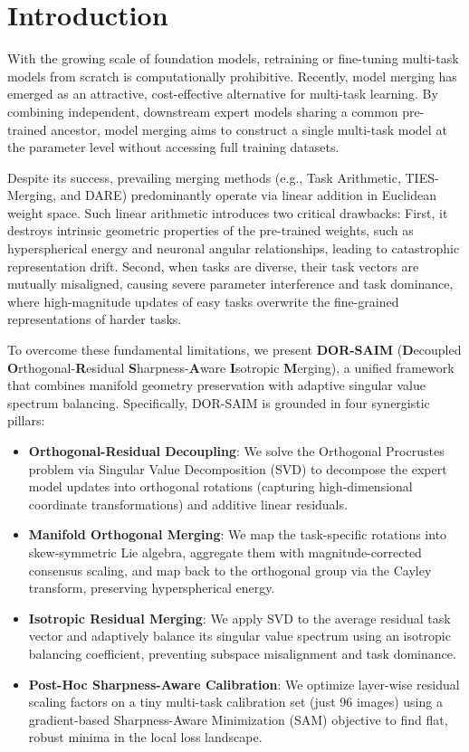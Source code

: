 \documentclass{article}
\begin{document}
\section{Introduction}
\label{sec:intro}
With the growing scale of foundation models, retraining or fine-tuning multi-task models from scratch is computationally prohibitive. Recently, model merging has emerged as an attractive, cost-effective alternative for multi-task learning. By combining independent, downstream expert models sharing a common pre-trained ancestor, model merging aims to construct a single multi-task model at the parameter level without accessing full training datasets.

Despite its success, prevailing merging methods (e.g., Task Arithmetic, TIES-Merging, and DARE) predominantly operate via linear addition in Euclidean weight space. Such linear arithmetic introduces two critical drawbacks: First, it destroys intrinsic geometric properties of the pre-trained weights, such as hyperspherical energy and neuronal angular relationships, leading to catastrophic representation drift. Second, when tasks are diverse, their task vectors are mutually misaligned, causing severe parameter interference and task dominance, where high-magnitude updates of easy tasks overwrite the fine-grained representations of harder tasks.

To overcome these fundamental limitations, we present \textbf{DOR-SAIM} (\textbf{D}ecoupled \textbf{O}rthogonal-\textbf{R}esidual \textbf{S}harpness-\textbf{A}ware \textbf{I}sotropic \textbf{M}erging), a unified framework that combines manifold geometry preservation with adaptive singular value spectrum balancing. Specifically, DOR-SAIM is grounded in four synergistic pillars:
\begin{itemize}
    \item \textbf{Orthogonal-Residual Decoupling}: We solve the Orthogonal Procrustes problem via Singular Value Decomposition (SVD) to decompose the expert model updates into orthogonal rotations (capturing high-dimensional coordinate transformations) and additive linear residuals.
    \item \textbf{Manifold Orthogonal Merging}: We map the task-specific rotations into skew-symmetric Lie algebra, aggregate them with magnitude-corrected consensus scaling, and map back to the orthogonal group via the Cayley transform, preserving hyperspherical energy.
    \item \textbf{Isotropic Residual Merging}: We apply SVD to the average residual task vector and adaptively balance its singular value spectrum using an isotropic balancing coefficient, preventing subspace misalignment and task dominance.
    \item \textbf{Post-Hoc Sharpness-Aware Calibration}: We optimize layer-wise residual scaling factors on a tiny multi-task calibration set (just 96 images) using a gradient-based Sharpness-Aware Minimization (SAM) objective to find flat, robust minima in the local loss landscape.
\end{itemize}
\end{document}

